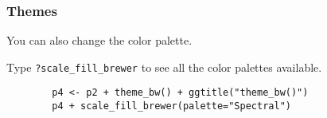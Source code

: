 \documentclass{beamer}
\begin{document}
	\begin{frame}[fragile]
		\frametitle{Themes}

		You can also change the color palette.

		Type \verb|?scale_fill_brewer| to see all the color palettes available.

		\begin{exampleblock}{}
		\begin{center}
		\begin{BVerbatim}
		p4 <- p2 + theme_bw() + ggtitle("theme_bw()")
		p4 + scale_fill_brewer(palette="Spectral")
		\end{BVerbatim}
		\end{center}
		\end{exampleblock}{}

	\end{frame}
\end{document}
